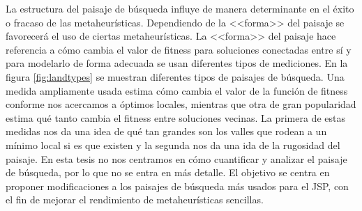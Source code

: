 La estructura del paisaje de búsqueda influye de manera determinante en el éxito o fracaso de las metaheurísticas. 
%
Dependiendo de la <<forma>> del paisaje se favorecerá el uso de ciertas metaheurísticas. 
%
La <<forma>> del paisaje hace referencia a cómo cambia el valor de fitness para soluciones conectadas entre sí y para modelarlo de forma adecuada se usan diferentes
tipos de mediciones. En la figura \ref{fig:landtypes} se muestran diferentes tipos de paisajes de búsqueda.
%
Una medida ampliamente usada estima cómo cambia el valor de la función de fitness conforme nos acercamos a óptimos locales, mientras que otra de gran popularidad 
estima qué tanto cambia el fitness entre soluciones vecinas\cite{skauffman}. 
%
La primera de estas medidas nos da una idea de qué tan grandes son los valles que rodean a un mínimo local si es que existen y la segunda nos da una ida de la 
rugosidad del paisaje.
%
En esta tesis no nos centramos en cómo cuantificar y analizar el paisaje de búsqueda, por lo que no se entra en más detalle.
%
El objetivo se centra en proponer modificaciones a los paisajes de búsqueda más usados para el JSP, con el fin de mejorar el rendimiento de metaheurísticas sencillas.

